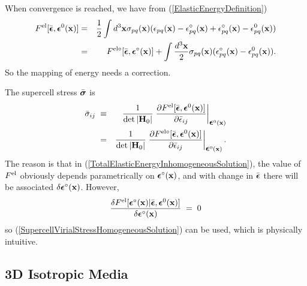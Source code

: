 \documentclass[12pt]{article}
\def\bmath#1{\mbox{\boldmath$#1$}}
\begin{document}
When convergence is reached, we have from (\ref{ElasticEnergyDefinition})
\begin{eqnarray}
 F^{\rm el}[\bar{\bmath{\epsilon}}, \bmath{\epsilon}^0({\bf x})] =&&
 \frac{1}{2}\int d^3{\bf x}  \sigma_{pq}({\bf x})
 ( \epsilon_{pq}({\bf x}) - \epsilon^\circ_{pq}({\bf x}) 
                          + \epsilon^\circ_{pq}({\bf x}) 
                          - \epsilon^0_{pq}({\bf x}) ) \nonumber\\
 =&& F^{\rm el\circ}[\bar{\bmath{\epsilon}}, 
\bmath{\epsilon}^\circ({\bf x})] + 
 \int \frac{d^3{\bf x}}{2} \sigma_{pq}({\bf x}) 
 (\epsilon^\circ_{pq}({\bf x}) - \epsilon^0_{pq}({\bf x})).
   \label{TotalElasticEnergyInhomogeneousSolution}
\end{eqnarray}
So the mapping of energy needs a correction.

The supercell stress $\bar{\bmath{\sigma}}$ is 
\begin{eqnarray}
 \bar{\sigma}_{ij} \;\equiv&& \frac{1}{\det|{\bf H}_0|}
 \left.\frac{\partial F^{\rm el}[\bar{\bmath{\epsilon}},
 \bmath{\epsilon}^0({\bf x})]}{\partial
 \bar{\epsilon}_{ij}}\right|_{\bmath{\epsilon}^0({\bf x})} \nonumber\\
=&& \frac{1}{\det|{\bf H}_0|}
 \left.\frac{\partial F^{\rm el\circ}[\bar{\bmath{\epsilon}},
 \bmath{\epsilon}^0({\bf x})]}{\partial
 \bar{\epsilon}_{ij}}\right|_{\bmath{\epsilon}^0({\bf x})}.
\end{eqnarray}
The reason is that in (\ref{TotalElasticEnergyInhomogeneousSolution}),
the value of $F^{\rm el}$ obviously depends parametrically on
$\bmath{\epsilon}^\circ({\bf x})$, and with change in
$\bar{\bmath{\epsilon}}$ there will be associated
$\delta\bmath{\epsilon}^\circ({\bf x})$.  However, 
\begin{equation}
 \frac{\delta F^{\rm el}[\bmath{\epsilon}^\circ({\bf x}) | \bar{\bmath{\epsilon}}, \bmath{\epsilon}^0({\bf x})] }{\delta \bmath{\epsilon}^\circ({\bf x})} \;=\; 0
\end{equation}
so (\ref{SupercellVirialStressHomogeneousSolution}) can be used, which
is physically intuitive.


\subsection{3D Isotropic Media}
\label{sec:3DIsotropicMedia}
\end{document}
